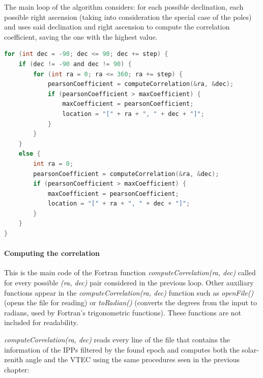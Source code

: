 The main loop of the algorithm considers: for each possible declination, each possible right ascension (taking into consideration the special case of the poles) and uses said declination and right ascension to compute the correlation coefficient, saving the one with the highest value.

\begin{minipage}{\linewidth}
\begin{lstlisting}[language=c, caption=Main loops]
for (int dec = -90; dec <= 90; dec += step) {
	if (dec != -90 and dec != 90) {
		for (int ra = 0; ra <= 360; ra += step) {
			pearsonCoefficient = computeCorrelation(&ra, &dec);
			if (pearsonCoefficient > maxCoefficient) {
				maxCoefficient = pearsonCoefficient;
				location = "[" + ra + ", " + dec + "]";
			}
		}
	}
	else {
		int ra = 0;
		pearsonCoefficient = computeCorrelation(&ra, &dec);
		if (pearsonCoefficient > maxCoefficient) {
			maxCoefficient = pearsonCoefficient;
			location = "[" + ra + ", " + dec + "]";
		}
	}
}
\end{lstlisting}
\end{minipage}

\paragraph{Computing the correlation}

This is the main code of the Fortran function \textit{computeCorrelation(ra, dec)} called for every possible \textit{(ra, dec)} pair considered in the previous loop. Other auxiliary functions appear in the \textit{computeCorrelation(ra, dec)} function such as \textit{openFile()} (opens the file for reading) or \textit{toRadian()} (converts the degrees from the input to radians, used by Fortran's trigonometric functions). These functions are not included for readability.

\textit{computeCorrelation(ra, dec)} reads every line of the file that contains the information of the IPPs filtered by the found epoch and computes both the solar-zenith angle and the VTEC using the same procedures seen in the previous chapter:

